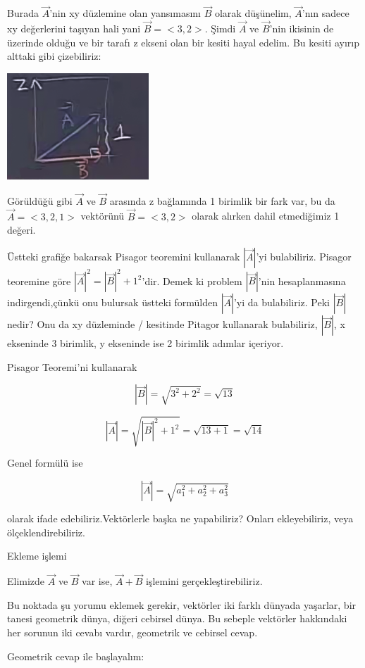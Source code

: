 \documentclass[12pt,fleqn]{article}\usepackage{../../common}
\begin{document}
Burada $\vec{A}$'nin xy düzlemine olan yansımasını $\vec{B}$ olarak düşünelim,
$\vec{A}$'nın sadece xy değerlerini taşıyan hali yani $\vec{B} = <3,2>$.  Şimdi
$\vec{A}$ ve $\vec{B}$'nin ikisinin de üzerinde olduğu ve bir tarafı z ekseni
olan bir kesiti hayal edelim. Bu kesiti ayırıp alttaki gibi çizebiliriz:

\includegraphics[height=4cm]{1_5.png}

Görüldüğü gibi $\vec{A}$ ve $\vec{B}$ arasında z bağlamında 1 birimlik bir fark
var, bu da $\vec{A} = <3,2,1>$ vektörünü $\vec{B}=<3,2>$ olarak alırken dahil
etmediğimiz 1 değeri.

Üstteki grafiğe bakarsak Pisagor teoremini kullanarak $|\vec{A}|$'yi
bulabiliriz. Pisagor teoremine göre $|\vec{A}|^2 = |\vec{B}|^2 + 1^2$'dir. Demek
ki problem $|\vec{B}|$'nin hesaplanmasına indirgendi,çünkü onu bulursak üstteki
formülden $|\vec{A}|$'yi da bulabiliriz. Peki $|\vec{B}|$ nedir? Onu da xy
düzleminde / kesitinde Pitagor kullanarak bulabiliriz, $|\vec{B}|$, x ekseninde
3 birimlik, y ekseninde ise 2 birimlik adımlar içeriyor.

Pisagor Teoremi'ni kullanarak

$$
|\vec{B}| = \sqrt{3^2 + 2^2} = \sqrt{13}
$$

$$
|\vec{A}| = \sqrt{|\vec{B}|^2 + 1^2} = \sqrt{13 + 1} = \sqrt{14}
$$

Genel formülü ise

$$
|\vec{A}| = \sqrt{a_1 ^2 + a_2^2 + a_3^2}
$$

olarak ifade edebiliriz.Vektörlerle başka ne yapabiliriz? Onları ekleyebiliriz, 
veya ölçeklendirebiliriz. 

Ekleme işlemi

Elimizde $\vec{A}$ ve $\vec{B}$ var ise, $\vec{A} + \vec{B}$ 
işlemini gerçekleştirebiliriz. 

Bu noktada şu yorumu eklemek gerekir, vektörler iki farklı dünyada
yaşarlar, bir tanesi geometrik dünya, diğeri cebirsel dünya. Bu sebeple 
vektörler hakkındaki her sorunun iki
cevabı vardır, geometrik ve cebirsel cevap.

Geometrik cevap ile başlayalım: 
\end{document}
